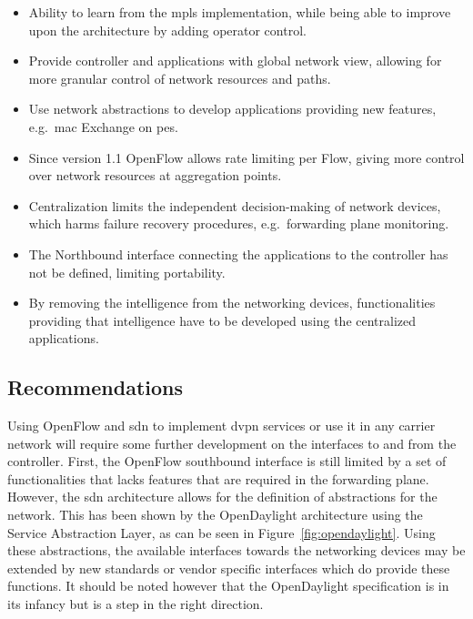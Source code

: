 \begin{minipage}[t]{0.5\textwidth}
\begin{itemize}[label=\checkmark]
	\item Ability to learn from the \ac{mpls} implementation, while being able to improve upon the architecture \cite{ss} by adding operator control.
	\item Provide controller and applications with global network view, allowing for more granular control of network resources and paths.
	\item Use network abstractions to develop applications providing new features, e.g.\ \ac{mac} Exchange on \acp{pe}.
	\item Since version 1.1 OpenFlow allows rate limiting per Flow, giving more control over network resources at aggregation points.
\end{itemize}
\end{minipage}%
\begin{minipage}[t]{0.5\textwidth}
\begin{itemize}[label=$\times$]
	\item Centralization limits the independent decision-making of network devices, which harms failure recovery procedures, e.g.\ forwarding plane monitoring.
	\item The Northbound interface connecting the applications to the controller has not be defined, limiting portability.
	\item By removing the intelligence from the networking devices, functionalities providing that intelligence have to be developed using the centralized applications.
\end{itemize}
\end{minipage}


\subsection{Recommendations} %
\label{sub:recommendations}


Using OpenFlow and \ac{sdn} to implement \ac{dvpn} services or use it in any carrier network will require some further development on the interfaces to and from the controller. First, the OpenFlow southbound interface is still limited by a set of functionalities that lacks features that are required in the forwarding plane. However, the \ac{sdn} architecture allows for the definition of abstractions for the network. This has been shown by the OpenDaylight architecture using the Service Abstraction Layer, as can be seen in Figure~\ref{fig:opendaylight}. Using these abstractions, the available interfaces towards the networking devices may be extended by new standards or vendor specific interfaces which do provide these functions. It should be noted however that the OpenDaylight specification is in its infancy but is a step in the right direction.

